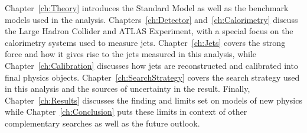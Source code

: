 Chapter~\ref{ch:Theory} introduces the Standard Model as well as the benchmark models used in the analysis.  Chapters~\ref{ch:Detector} and~\ref{ch:Calorimetry} discuss the Large Hadron Collider and ATLAS Experiment, with a special focus on the calorimetry systems used to measure jets.  Chapter~\ref{ch:Jets} covers the strong force and how it gives rise to the jets measured in this analysis, while Chapter~\ref{ch:Calibration} discusses how jets are reconstructed and calibrated into final physics objects.  Chapter~\ref{ch:SearchStrategy} covers the search strategy used in this analysis and the sources of uncertainty in the result.  Finally, Chapter~\ref{ch:Results} discusses the finding and limits set on models of new physics while Chapter~\ref{ch:Conclusion} puts these limits in context of other complementary searches as well as the future outlook.

